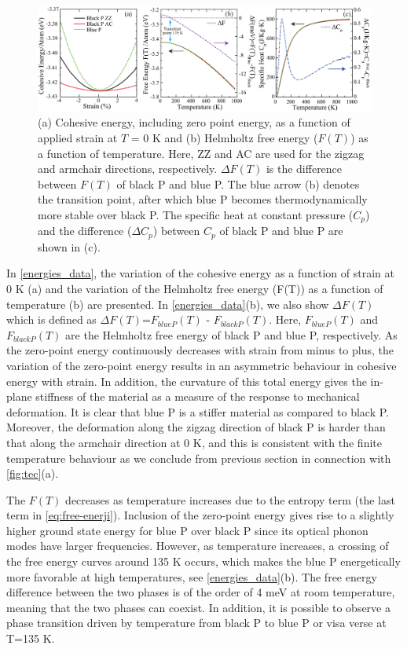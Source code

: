 \begin{figure}[htbp]
\centering
\includegraphics[width=\linewidth]{freeE_T.eps}%
\caption[Thermal properties variations of phosphorene with temperature]{(a) Cohesive energy, including zero point energy, as a function of applied strain at $T$ = 0 K and (b) Helmholtz free energy ($F(T)$) as a function of temperature.  Here, ZZ and AC are used for the zigzag and armchair directions, respectively. $\Delta F(T)$ is the difference between $F(T)$ of black P and blue P. The blue arrow  (b) denotes the transition point, after which blue P becomes thermodynamically more stable over black P.  The specific heat at constant pressure ($C_p$) and the difference ($\Delta C_p$) between $C_p$ of black P and blue P are shown in (c).  \label{energies_data}}
\end{figure}

In \autoref{energies_data}, the variation of the cohesive energy as a function of strain at 0 K (a) and the variation of the Helmholtz free energy (F(T)) as a function of temperature (b) are presented. In \autoref{energies_data}(b), 
we also show $\Delta F(T)$ which is defined as $\Delta F(T)$=$F_{blue P}(T)$ - $F_{black P}(T)$. Here, $F_{blue P}(T)$ and $F_{black P}(T)$ are the Helmholtz free energy of black P and blue P, respectively. As the zero-point energy continuously decreases with strain from minus to plus, the variation of the zero-point energy results in an asymmetric behaviour in cohesive energy with strain. In addition, the curvature of this total energy gives the in-plane stiffness of the material as a measure of the response to mechanical deformation. It is clear that blue P is a stiffer material as compared to black P.  Moreover, the deformation along the zigzag direction of black P is harder than that along the armchair direction at 0 K, and this is consistent with the finite temperature behaviour as we conclude from previous section in connection with \autoref{fig:tec}(a). 

The $F(T)$ decreases as temperature increases due to the entropy term (the last term in \autoref{eq:free-enerji}). Inclusion of the zero-point energy gives rise to a slightly higher ground state energy for blue P over black P since its optical phonon modes have larger frequencies. However, as temperature increases, a crossing of the free energy curves around 135 K occurs, which makes the blue P energetically more favorable at high temperatures, see \autoref{energies_data}(b). The free energy difference between the two phases is of the order of 4 meV at room temperature, meaning that the two phases can coexist. In addition, it is possible to observe a phase transition driven by temperature from black P to blue P or visa verse at T=135 K. 

